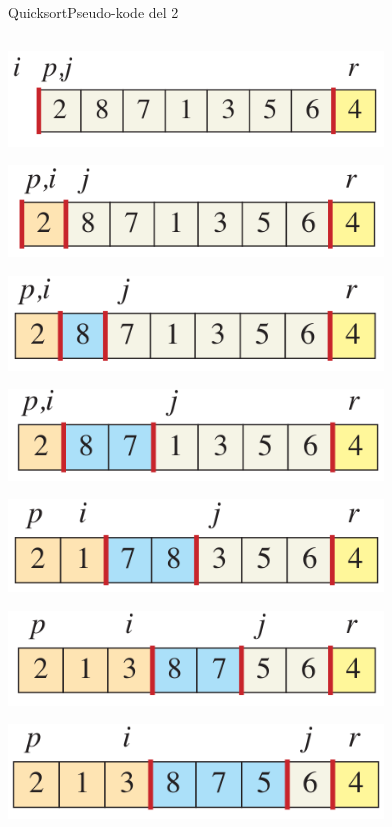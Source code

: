 \documentclass[aspectratio=1610]{beamer}
\begin{document}
\begin{frame}{Quicksort}{Pseudo-kode del 2}
\begin{columns}
        \vfill
        \begin{overprint}
            \centerline{\includegraphics[width=0.8\textwidth]{quicksort/example-a}}
            \centerline{\includegraphics[width=0.8\textwidth]{quicksort/example-b}}
            \centerline{\includegraphics[width=0.8\textwidth]{quicksort/example-c}}
            \centerline{\includegraphics[width=0.8\textwidth]{quicksort/example-d}}
            \centerline{\includegraphics[width=0.8\textwidth]{quicksort/example-e}}
            \centerline{\includegraphics[width=0.8\textwidth]{quicksort/example-f}}
            \centerline{\includegraphics[width=0.8\textwidth]{quicksort/example-g}}

\end{overprint}
\end{columns}
\end{frame}
\end{document}
